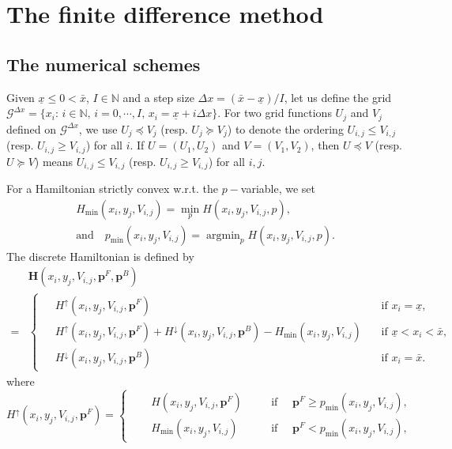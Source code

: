 \documentclass[11pt]{article}
\numberwithin{equation}{section}
\numberwithin{algorithm}{section}
\newcommand{\lc}{\left(}
\newcommand{\rc}{\right)}
\newcommand{\ux}{{\underline x}}
\newcommand{\beq}{\begin{equation}}
\newcommand{\eeq}{\end{equation}}
\theoremstyle{plain}
\newcommand{\D}{\Delta}
\begin{document}
\section{The finite difference method}
\subsection{The numerical schemes}
Given $\ux\leq 0<\bar{x}$, $I\in \mathbb{N}$ and a step size $\D x=(\bar{x}-\ux)/I$, let us define the grid $\mathcal{G}^{\D x}=\{x_i:\,i\in \mathbb{N},\,i=0,\cdots,I,\,x_i=\ux+i\D x\}$. For two grid functions $U_j$ and $V_j$ defined on $\mathcal{G}^{\D x}$, we use $U_j\preceq V_j$ (resp. $U_j \succeq V_j$) to denote the ordering $U_{i,j}\leq V_{i,j}$ (resp. $U_{i,j}\geq V_{i,j}$) for all $i$. If $U=(U_1,U_2)$ and $V=(V_1,V_2)$, then $U\preceq V$ (resp. $U\succeq V$) means $U_{i,j}\leq V_{i,j}$ (resp. $U_{i,j}\geq V_{i,j}$) for all $i,j$. \par
For a Hamiltonian strictly convex w.r.t. the $p-$variable, we set
\beq\label{Eq: Hmin}
\begin{aligned}
{H}_{\min}\lc x_i,y_j,V_{i,j}\rc=\min_p H\lc x_i,y_j,V_{i,j},p\rc,\\
 {\text{and}}\quad {p}_{\min}\lc x_i,y_j,V_{i,j}\rc=\mathop{\arg\min}_{p}H\lc x_i,y_j,V_{i,j},p\rc.
\end{aligned}
\eeq
The discrete Hamiltonian is defined by
\beq\label{Eq: H num}
\begin{aligned}
&\boldsymbol{H}\lc x_i,y_j,V_{i,j},\boldsymbol{p}^{F},\boldsymbol{p}^{B}\rc\\
={}&\left\{
      \begin{aligned}
\,\, &{H}^{\uparrow}\lc x_i,y_j,V_{i,j},\boldsymbol{p}^{F}\rc\,  && \text{if}\,\,x_i=\ux,\\
&{H}^{\uparrow}\lc x_i,y_j,V_{i,j},\boldsymbol{p}^{F}\rc+{H}^{\downarrow} \lc x_i,y_j,V_{i,j},\boldsymbol{p}^{B}\rc-{H}_{\min}\lc x_i,y_j,V_{i,j}\rc\,  && \text{if}\,\,\ux<x_i<\bar{x},\\
&{H}^{\downarrow}\lc x_i,y_j,V_{i,j},\boldsymbol{p}^{B}\rc\,  && \text{if}\, \,x_i=\bar{x}.
    \end{aligned}
   \right.
       \end{aligned}
\eeq
where
\begin{equation}\label{Eq: H up}
  {H}^{\uparrow}\lc x_i,y_j,V_{i,j},\boldsymbol{p}^{F}\rc=\left\{
      \begin{aligned}
     \quad &H\lc x_i,y_j,V_{i,j},\boldsymbol{p}^{F}\rc  \quad && \text{if }\quad \boldsymbol{p}^{F}\geq {p}_{\min}\lc x_i,y_j,V_{i,j}\rc,\\
      &{H}_{\min}\lc x_i,y_j,V_{i,j}\rc\quad  && \text{if }\quad \boldsymbol{p}^{F}<{p}_{\min}\lc x_i,y_j,V_{i,j}\rc,
     \end{aligned}
   \right.
\end{equation}
\end{document}
